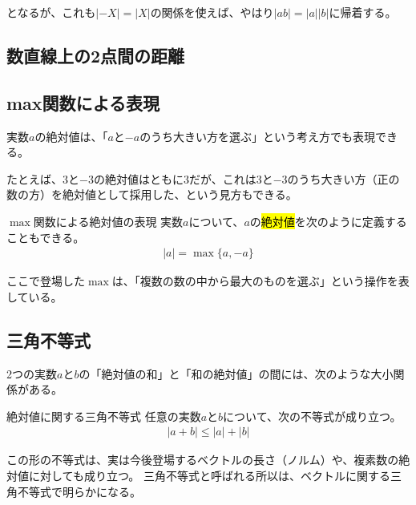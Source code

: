 \documentclass[../../math-imaging]{subfiles}
\begin{document}
となるが、これも$|-X| = |X|$の関係を使えば、やはり$|ab| = |a||b|$に帰着する。

\subsection{数直線上の2点間の距離}

\wip

\subsection{max関数による表現}

実数$a$の絶対値は、「$a$と$-a$のうち大きい方を選ぶ」という考え方でも表現できる。

たとえば、$3$と$-3$の絶対値はともに$3$だが、これは$3$と$-3$のうち大きい方（正の数の方）を絶対値として採用した、という見方もできる。

\begin{definition}{$\max$関数による絶対値の表現}
  \newline
  実数$a$について、$a$の\hl{絶対値}を次のように定義することもできる。
  \LARGE
  \begin{align}
    |a| = \max\{a, -a\}
  \end{align}
\end{definition}

ここで登場した$\max$は、「複数の数の中から最大のものを選ぶ」という操作を表している。

\subsection{三角不等式}

2つの実数$a$と$b$の「絶対値の和」と「和の絶対値」の間には、次のような大小関係がある。

\begin{theorem}{絶対値に関する三角不等式}
  \newline
  任意の実数$a$と$b$について、次の不等式が成り立つ。
  \LARGE
  \begin{align}
    |a + b| \leq |a| + |b|
  \end{align}
\end{theorem}

\begin{supplnote}
  この形の不等式は、実は今後登場するベクトルの長さ（ノルム）や、複素数の絶対値に対しても成り立つ。
  三角不等式と呼ばれる所以は、ベクトルに関する三角不等式で明らかになる。
\end{supplnote}
\end{document}
